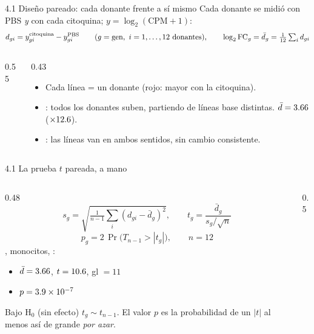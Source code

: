 \begin{frame}{4.1 Diseño pareado: cada donante frente a sí mismo}
  Cada donante se midió con PBS \emph{y} con cada citoquina; $y=\log_2(\text{CPM}+1)$:
  \[ d_{gi}=y^{\text{citoquina}}_{gi}-y^{\text{PBS}}_{gi}\qquad(g=\text{gen},\ i=1,\dots,12\ \text{donantes}),\qquad \lfc_g=\bar d_g=\tfrac1{12}\textstyle\sum_i d_{gi} \]
  \begin{columns}[c]
    \begin{column}{0.55\linewidth}
    \end{column}
    \begin{column}{0.43\linewidth}\small
      \begin{itemize}\setlength\itemsep{3pt}
        \item Cada línea = un donante (rojo: mayor con la citoquina).
        \item {}: todos los donantes suben, partiendo de líneas base distintas. $\bar d=3.66$ ($\times12.6$).
        \item {}: las líneas van en ambos sentidos, sin cambio consistente.
      \end{itemize}
    \end{column}
  \end{columns}
\end{frame}

\begin{frame}{4.1 La prueba $t$ pareada, a mano}
  \begin{columns}[c]
    \begin{column}{0.48\linewidth}
      \[
        s_g=\sqrt{\tfrac1{n-1}\textstyle\sum_i(d_{gi}-\bar d_g)^2},\qquad
        t_g=\frac{\bar d_g}{s_g/\sqrt n}
      \]
      \[ p_g=2\,\Pr\bigl(T_{n-1}>|t_g|\bigr),\qquad n=12 \]
      \small
      , monocitos, \IFNg:
      \begin{itemize}\setlength\itemsep{1pt}
        \item $\bar d=3.66$, \quad $t=10.6$, \quad gl $=11$
        \item $p=3.9\times10^{-7}$
      \end{itemize}
      Bajo H$_0$ (sin efecto) $t_g\sim t_{n-1}$. El valor $p$ es la probabilidad de un $|t|$ al menos así de grande \emph{por azar}.
    \end{column}
    \begin{column}{0.5\linewidth}
    \end{column}
  \end{columns}
\end{frame}

